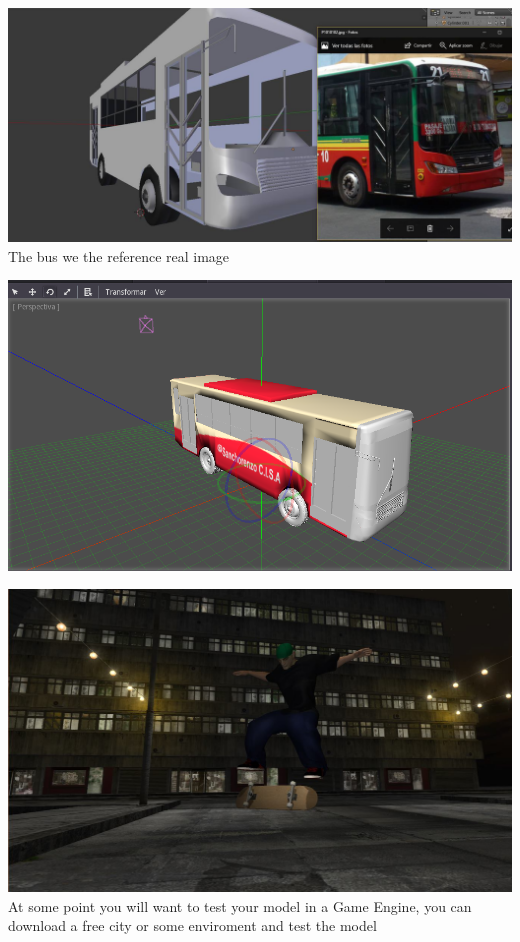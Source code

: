 \documentclass{article}
\begin{document}
  \includegraphics[width=\textwidth]{43.jpg}
  The bus we the reference real image
  
  \includegraphics[width=\textwidth]{44.png}

  \includegraphics[width=\textwidth]{20.jpg}
  At some point you will want to test your model in a Game Engine, you can download a free city or some enviroment and test the model
\end{document}
